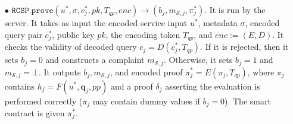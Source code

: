 \begin{definition}[RC-S-P Scheme]
\begin{itemize}


\


\item[$\bullet$] $\mathtt{RCSP}.\mathtt{prove}(u^{\scriptscriptstyle *},  \sigma,  c^{\scriptscriptstyle *}_{\scriptscriptstyle j},pk, T_{\scriptscriptstyle qp},enc)\rightarrow (b_{\scriptscriptstyle j},m_{\scriptscriptstyle \mathcal{S},j},\pi^{\scriptscriptstyle *}_{\scriptscriptstyle j})$. It is run by the server. It  takes as input the encoded service input $u^{\scriptscriptstyle *}$, metadata $\sigma$,   encoded query pair $c^{\scriptscriptstyle *}_{\scriptscriptstyle j}$,  public key $pk$,    the encoding token $T_{\scriptscriptstyle qp}$, and $enc:=(E,D)$.   It checks the validity of decoded query $c_{\scriptscriptstyle j}=D(c^{\scriptscriptstyle *}_{\scriptscriptstyle j},T_{\scriptscriptstyle qp})$.  If it is rejected, then it sets $b_{\scriptscriptstyle j}=0$ and constructs a complaint $m_{\scriptscriptstyle \mathcal{S},j}$. Otherwise,  it   sets $b_{\scriptscriptstyle j}=1$ and $m_{\scriptscriptstyle \mathcal{S},j}=\bot$. It outputs $b_{\scriptscriptstyle j},m_{\scriptscriptstyle \mathcal{S},j}$,   and  encoded proof $\pi^{\scriptscriptstyle *}_{\scriptscriptstyle j}=E(\pi_{\scriptscriptstyle j},T_{\scriptscriptstyle qp})$, where  $\pi_{\scriptscriptstyle j}$ contains $h_{\scriptscriptstyle j}=F(u^{\scriptscriptstyle *},\bm{q}_{\scriptscriptstyle j},{pp})$ and a proof $\delta_{\scriptscriptstyle j}$  asserting the evaluation is performed correctly ($\pi_{\scriptscriptstyle j}$ may contain dummy values if $b_{\scriptscriptstyle j}=0$). The smart contract is given $\pi^{\scriptscriptstyle *}_{\scriptscriptstyle j}$.




\end{itemize}
\end{definition}
